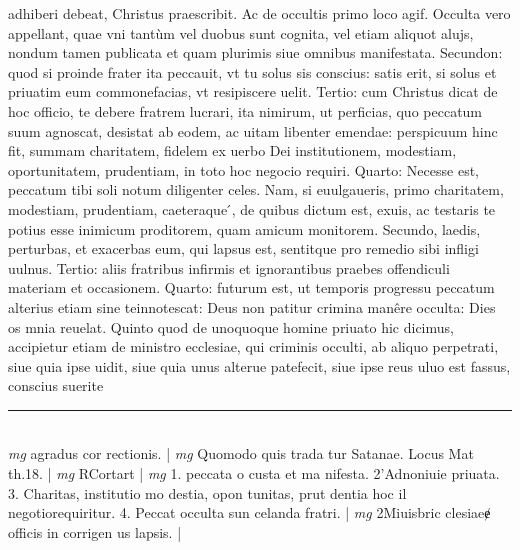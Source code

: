 \documentclass{article}
\begin{document}
\begin{pages}
adhiberi debeat, Christus praescribit. Ac de occultis primo loco agif. Occulta vero appellant, quae vni tantùm vel duobus  sunt cognita, vel etiam aliquot alujs, nondum tamen publicata et quam plurimis siue omnibus  manifestata. Secundon: quod si proinde frater ita peccauit, vt tu solus sis conscius: satis erit, si solus et priuatim eum commonefacias, vt resipiscere uelit. Tertio: cum Christus dicat de hoc officio, te debere fratrem lucrari, ita nimirum, ut perficias, quo peccatum suum agnoscat, desistat ab eodem, ac uitam libenter emendae: perspicuum hinc fit, summam charitatem, fidelem ex uerbo Dei institutionem, modestiam, oportunitatem, prudentiam, in toto hoc negocio requiri. Quarto: Necesse est, peccatum tibi soli notum diligenter celes. Nam, si euulgaueris, primo charitatem, modestiam, prudentiam, caeteraque ́, de quibus dictum est, exuis, ac testaris te potius esse inimicum proditorem, quam amicum monitorem. Secundo, laedis, perturbas, et exacerbas eum, qui lapsus est, sentitque pro remedio sibi infligi uulnus. Tertio: aliis fratribus infirmis et ignorantibus praebes offendiculi materiam et occasionem. Quarto: futurum est, ut temporis progressu peccatum alterius etiam sine teinnotescat: Deus non patitur crimina manêre occulta: Dies os mnia reuelat. Quinto quod de unoquoque homine priuato hic dicimus, accipietur etiam de ministro ecclesiae, qui criminis occulti, ab aliquo perpetrati, siue quia ipse uidit, siue quia unus alterue patefecit, siue ipse reus uluo est fassus, conscius suerite  \pend
\vspace{0.5cm}\noindent
\vspace{0.2cm}\rule{1cm}{0.2pt}\\ 
\hspace{0.2cm}\textit{mg}
\footnotesize agradus cor rectionis. 
\normalsize| 
\hspace{0.2cm}\textit{mg}
\footnotesize Quomodo quis trada tur Satanae. Locus Mat th.18. 
\normalsize| 
\hspace{0.2cm}\textit{mg}
\footnotesize RCortart 
\normalsize| 
\hspace{0.2cm}\textit{mg}
\footnotesize 1. peccata o custa et ma nifesta. 2'Adnoniuie priuata. 3. Charitas, institutio mo destia, opon tunitas, prut dentia hoc il negotiorequiritur. 4. Peccat occulta sun celanda fratri. 
\normalsize| 
\hspace{0.2cm}\textit{mg}
\footnotesize 2Miuisbric clesiaeɇ officis in corrigen us lapsis. 
\normalsize| 

\end{pages}
\end{document}
